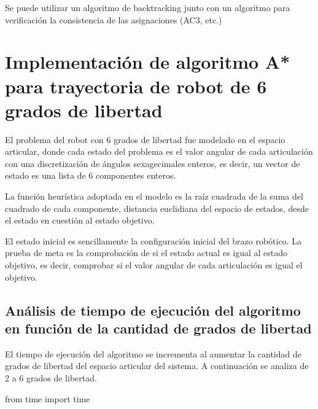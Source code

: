 \documentclass[
]{article}
\newenvironment{Shaded}{}{}
\newcommand{\ImportTok}[1]{#1}
\newcommand{\NormalTok}[1]{#1}
\begin{document}
Se puede utilizar un algoritmo de backtracking junto con un algoritmo
para verificación la consistencia de las asignaciones (AC3, etc.)

\hypertarget{implementaciuxf3n-de-algoritmo-a-para-trayectoria-de-robot-de-6-grados-de-libertad}{%
\section{Implementación de algoritmo A* para trayectoria de robot de 6
grados de
libertad}\label{implementaciuxf3n-de-algoritmo-a-para-trayectoria-de-robot-de-6-grados-de-libertad}}

El problema del robot con 6 grados de libertad fue modelado en el
espacio articular, donde cada estado del problema es el valor angular de
cada articulación con una discretización de ángulos sexagecimales
enteros, es decir, un vector de estado es una lista de 6 componentes
enteros.

La función heurística adoptada en el modelo es la raíz cuadrada de la
suma del cuadrado de cada componente, distancia euclidiana del espacio
de estados, desde el estado en cuestión al estado objetivo.

El estado inicial es sencillamente la configuración inicial del brazo
robótico. La prueba de meta es la comprobación de si el estado actual es
igual al estado objetivo, es decir, comprobar si el valor angular de
cada articulación es igual el objetivo.

\hypertarget{anuxe1lisis-de-tiempo-de-ejecuciuxf3n-del-algoritmo-en-funciuxf3n-de-la-cantidad-de-grados-de-libertad}{%
\subsection{Análisis de tiempo de ejecución del algoritmo en función de
la cantidad de grados de
libertad}\label{anuxe1lisis-de-tiempo-de-ejecuciuxf3n-del-algoritmo-en-funciuxf3n-de-la-cantidad-de-grados-de-libertad}}

El tiempo de ejecución del algoritmo se incrementa al aumentar la
cantidad de grados de libertad del espacio articular del sistema. A
continuación se analiza de 2 a 6 grados de libertad.

\begin{Shaded}
\begin{Highlighting}[]
\ImportTok{from}\NormalTok{ time }\ImportTok{import}\NormalTok{ time}
\end{Highlighting}
\end{Shaded}
\end{document}
